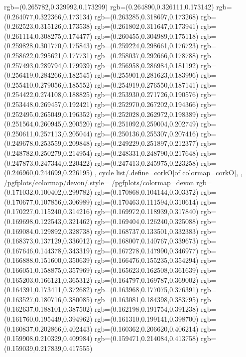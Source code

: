 {{{			rgb=(0.265782,0.329992,0.173299)
			rgb=(0.264890,0.326111,0.173142)
			rgb=(0.264077,0.322366,0.173134)
			rgb=(0.263285,0.318697,0.173268)
			rgb=(0.262523,0.315126,0.173538)
			rgb=(0.261802,0.311647,0.173941)
			rgb=(0.261114,0.308275,0.174477)
			rgb=(0.260455,0.304989,0.175118)
			rgb=(0.259828,0.301770,0.175843)
			rgb=(0.259224,0.298661,0.176723)
			rgb=(0.258622,0.295621,0.177731)
			rgb=(0.258037,0.292666,0.178788)
			rgb=(0.257493,0.289794,0.179939)
			rgb=(0.256958,0.286984,0.181192)
			rgb=(0.256419,0.284266,0.182545)
			rgb=(0.255901,0.281623,0.183996)
			rgb=(0.255410,0.279056,0.185552)
			rgb=(0.254919,0.276550,0.187141)
			rgb=(0.254422,0.274108,0.188825)
			rgb=(0.253930,0.271726,0.190576)
			rgb=(0.253448,0.269457,0.192421)
			rgb=(0.252970,0.267202,0.194366)
			rgb=(0.252495,0.265049,0.196352)
			rgb=(0.252028,0.262972,0.198389)
			rgb=(0.251564,0.260945,0.200520)
			rgb=(0.251092,0.259004,0.202749)
			rgb=(0.250611,0.257113,0.205044)
			rgb=(0.250136,0.255307,0.207416)
			rgb=(0.249678,0.253559,0.209848)
			rgb=(0.249229,0.251897,0.212377)
			rgb=(0.248782,0.250279,0.214954)
			rgb=(0.248331,0.248790,0.217648)
			rgb=(0.247873,0.247344,0.220422)
			rgb=(0.247413,0.245975,0.223258)
			rgb=(0.246960,0.244699,0.226195)
		},
	cycle list/.define={corkO}{[of colormap=corkO]},
	},
	/pgfplots/colormap/devon/.style={
		/pgfplots/colormap={devon}{%
			rgb=(0.171032,0.100402,0.299782)
			rgb=(0.170868,0.104144,0.303372)
			rgb=(0.170677,0.107856,0.306989)
			rgb=(0.170463,0.111594,0.310614)
			rgb=(0.170227,0.115240,0.314216)
			rgb=(0.169972,0.118939,0.317840)
			rgb=(0.169698,0.122543,0.321462)
			rgb=(0.169404,0.126240,0.325088)
			rgb=(0.169084,0.129892,0.328738)
			rgb=(0.168737,0.133501,0.332383)
			rgb=(0.168373,0.137129,0.336012)
			rgb=(0.168007,0.140767,0.339673)
			rgb=(0.167646,0.144378,0.343319)
			rgb=(0.167278,0.147990,0.346977)
			rgb=(0.166888,0.151600,0.350639)
			rgb=(0.166476,0.155235,0.354294)
			rgb=(0.166051,0.158875,0.357969)
			rgb=(0.165623,0.162508,0.361639)
			rgb=(0.165203,0.166121,0.365312)
			rgb=(0.164797,0.169787,0.369002)
			rgb=(0.164391,0.173411,0.372682)
			rgb=(0.163968,0.177075,0.376391)
			rgb=(0.163527,0.180716,0.380085)
			rgb=(0.163081,0.184398,0.383795)
			rgb=(0.162637,0.188101,0.387502)
			rgb=(0.162198,0.191754,0.391238)
			rgb=(0.161760,0.195449,0.394962)
			rgb=(0.161310,0.199141,0.398700)
			rgb=(0.160837,0.202866,0.402443)
			rgb=(0.160362,0.206620,0.406214)
			rgb=(0.159908,0.210329,0.409984)
			rgb=(0.159471,0.214084,0.413758)
			rgb=(0.159039,0.217839,0.417555)
}}}
